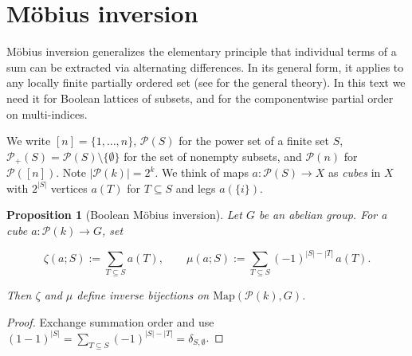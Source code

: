 \documentclass[10pt,a4paper]{article}
\theoremstyle{plain}
\newtheorem{proposition}[theorem]{Proposition}
\theoremstyle{definition}
\newcommand{\1}{\mathbb{1}} %
\newcommand{\set}[1]{\{#1\}} %
\newcommand{\KP}{\mathcal{P}}
\begin{document}
\section{Möbius inversion}\label{muxf6bius-inversion}

Möbius inversion generalizes the elementary principle that individual
terms of a sum can be extracted via alternating differences. In its
general form, it applies to any locally finite partially ordered set
(see \citep{Stanley2012} for the general theory). In this text we need
it for Boolean lattices of subsets, and for the componentwise partial
order on multi-indices.

We write \([n] = \set{1, \dots, n}\), \(\KP(S)\) for the power set of a
finite set \(S\), \(\KP_+(S) = \KP(S) \setminus \set{\emptyset}\) for
the set of nonempty subsets, and \(\KP(n)\) for \(\KP([n])\). Note
\(|\KP(k)| = 2^k\). We think of maps \(a: \KP(S) \to X\) as \emph{cubes}
in \(X\) with \(2^{|S|}\) vertices \(a(T)\) for \(T \subseteq S\) and
legs \(a(\set{i})\).

\begin{proposition}[Boolean Möbius inversion]

\label{prop:moebius-inversion} Let \(G\) be an abelian group. For a cube
\(a: \KP(k) \to G\), set

\[
  \zeta(a; S) := \sum_{T \subseteq S} a(T), \qquad \mu(a; S) := \sum_{T \subseteq S} (-1)^{|S|-|T|}\, a(T).
\]

Then \(\zeta\) and \(\mu\) define inverse bijections on
\(\mathrm{Map}(\KP(k), G)\).

\end{proposition}

\begin{proof}

Exchange summation order and use
\((1-1)^{|S|} = \sum_{T \subseteq S} (-1)^{|S|-|T|} = \delta_{S,\emptyset}\).

\end{proof}
\end{document}
